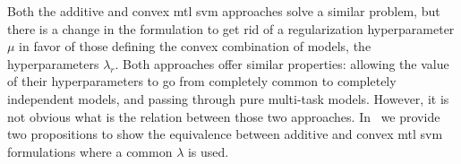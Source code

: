 Both the {additive} and {convex} \acrshort{mtl} \acrshort{svm} approaches solve a similar problem, but there is a change in the formulation to get rid of a regularization hyperparameter $\mu$ in favor of those defining the convex combination of models, the hyperparameters $\lambda_r$.
Both approaches offer similar properties: allowing the value of their hyperparameters to go from completely common to completely independent models, and passing through pure multi-task models.
However, it is not obvious what is the relation between those two approaches.
In~\cite{RuizAD19} we provide two propositions to show the equivalence between {additive} and {convex} \acrshort{mtl} \acrshort{svm} formulations where a common $\lambda$ is used.
